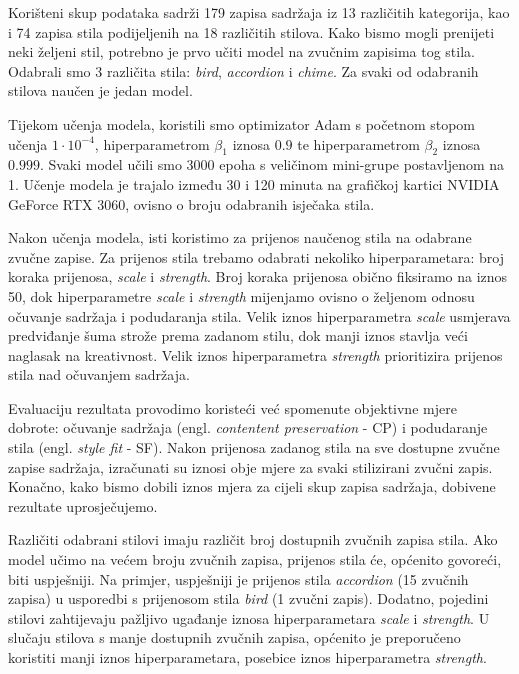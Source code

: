 Korišteni skup podataka sadrži 179 zapisa sadržaja iz 13 različitih kategorija, kao i 74 zapisa stila podijeljenih na 18 različitih stilova. Kako bismo mogli prenijeti neki željeni stil, potrebno je prvo učiti model na zvučnim zapisima tog stila. Odabrali smo 3 različita stila: \textit{bird}, \textit{accordion} i \textit{chime}. Za svaki od odabranih stilova naučen je jedan model.

Tijekom učenja modela, koristili smo optimizator Adam s početnom stopom učenja $1\cdot 10^{-4}$, hiperparametrom $\beta_1$ iznosa $0.9$ te hiperparametrom $\beta_2$ iznosa $0.999$. Svaki model učili smo 3000 epoha s veličinom mini-grupe postavljenom na 1. Učenje modela je trajalo između 30 i 120 minuta na grafičkoj kartici NVIDIA GeForce RTX 3060, ovisno o broju odabranih isječaka stila.

Nakon učenja modela, isti koristimo za prijenos naučenog stila na odabrane zvučne zapise. Za prijenos stila trebamo odabrati nekoliko hiperparametara: broj koraka prijenosa, \textit{scale} i \textit{strength}. Broj koraka prijenosa obično fiksiramo na iznos 50, dok hiperparametre \textit{scale} i \textit{strength} mijenjamo ovisno o željenom odnosu očuvanje sadržaja i podudaranja stila. Velik iznos hiperparametra \textit{scale} usmjerava predviđanje šuma strože prema zadanom stilu, dok manji iznos stavlja veći naglasak na kreativnost. Velik iznos hiperparametra \textit{strength} prioritizira prijenos stila nad očuvanjem sadržaja.

Evaluaciju rezultata provodimo koristeći već spomenute objektivne mjere dobrote: očuvanje sadržaja (engl. \textit{contentent preservation} - CP) i podudaranje stila (engl. \textit{style fit} - SF). Nakon prijenosa zadanog stila na sve dostupne zvučne zapise sadržaja, izračunati su iznosi obje mjere za svaki stilizirani zvučni zapis. Konačno, kako bismo dobili iznos mjera za cijeli skup zapisa sadržaja, dobivene rezultate uprosječujemo.

Različiti odabrani stilovi imaju različit broj dostupnih zvučnih zapisa stila. Ako model učimo na većem broju zvučnih zapisa, prijenos stila će, općenito govoreći, biti uspješniji. Na primjer, uspješniji je prijenos stila \textit{accordion} (15 zvučnih zapisa) u usporedbi s prijenosom stila \textit{bird} (1 zvučni zapis). Dodatno, pojedini stilovi zahtijevaju pažljivo ugađanje iznosa hiperparametara \textit{scale} i \textit{strength}. U slučaju stilova s manje dostupnih zvučnih zapisa, općenito je preporučeno koristiti manji iznos hiperparametara, posebice iznos hiperparametra \textit{strength}.


